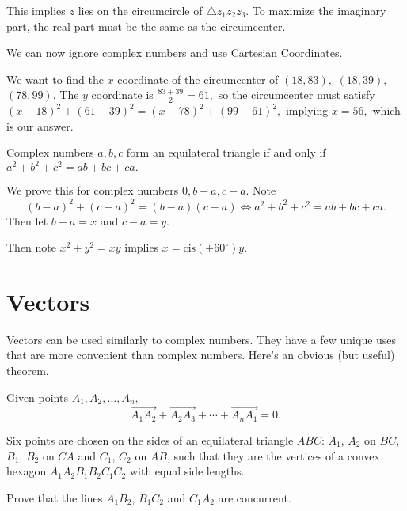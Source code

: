 \documentclass[blue,onecol]{shooting}
\begin{document}
\begin{sol}
This implies $z$ lies on the circumcircle of $\triangle z_1z_2z_3.$ To maximize the imaginary part, the real part must be the same as the circumcenter.

We can now ignore complex numbers and use Cartesian Coordinates.

We want to find the $x$ coordinate of the circumcenter of $(18, 83),$ $(18, 39),$ $(78, 99).$ The $y$ coordinate is $\frac{83+39}{2}=61,$ so the circumcenter must satisfy $(x-18)^2+(61-39)^2=(x-78)^2+(99-61)^2,$ implying $x=56,$ which is our answer.
\end{sol}

\begin{theo}
Complex numbers $a,b,c$ form an equilateral triangle if and only if $a^2+b^2+c^2=ab+bc+ca.$
\end{theo}

\begin{pro}
We prove this for complex numbers $0,b-a,c-a.$ Note 
\[(b-a)^2+(c-a)^2=(b-a)(c-a)\Leftrightarrow a^2+b^2+c^2=ab+bc+ca.\]
Then let $b-a=x$ and $c-a=y.$

Then note $x^2+y^2=xy$ implies $x=\text{cis}(\pm 60^{\circ})y.$
\end{pro}

\section{Vectors}
Vectors can be used similarly to complex numbers. They have a few unique uses that are more convenient than complex numbers. Here's an obvious (but useful) theorem.

\begin{theo}[Polygon]
Given points $A_1,A_2,\ldots,A_n,$
\[\overrightarrow{A_1A_2}+\overrightarrow{A_2A_3}+\cdots+\overrightarrow{A_nA_1}=0.\]
\end{theo}

\begin{exam}[IMO 2005/1]
Six points are chosen on the sides of an equilateral triangle $ABC$: $A_1$, $A_2$ on $BC$, $B_1$, $B_2$ on $CA$ and $C_1$, $C_2$ on $AB$, such that they are the vertices of a convex hexagon $A_1A_2B_1B_2C_1C_2$ with equal side lengths.

Prove that the lines $A_1B_2$, $B_1C_2$ and $C_1A_2$ are concurrent.
\end{exam}
\end{document}

